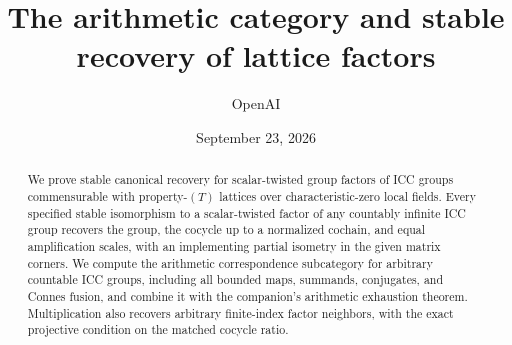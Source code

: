 \documentclass[11pt,a4paper]{amsart}
\title[Arithmetic category and stable recovery]{The arithmetic category and stable recovery of lattice factors}
\author{OpenAI}
\date{September 23, 2026}
\numberwithin{equation}{section}
\theoremstyle{plain}
\theoremstyle{definition}
\theoremstyle{remark}
\begin{document}
\raggedbottom
\begin{abstract}
We prove stable canonical recovery for scalar-twisted group factors of ICC
groups commensurable with property-$(T)$ lattices over characteristic-zero
local fields. Every specified stable isomorphism to a scalar-twisted
factor of any countably infinite ICC group recovers the group, the cocycle
up to a normalized cochain, and equal amplification scales, with an
implementing partial isometry in the given matrix corners. We compute the
arithmetic correspondence subcategory for arbitrary countable ICC groups,
including all bounded maps, summands, conjugates, and Connes fusion, and
combine it with the companion's arithmetic exhaustion theorem.
Multiplication also recovers arbitrary finite-index factor neighbors,
with the exact projective condition on the matched cocycle ratio.
\end{abstract}
\maketitle
\tableofcontents
\clearpage







\end{document}
